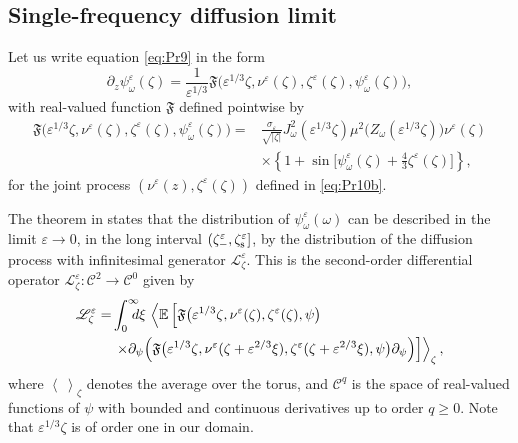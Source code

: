 \documentclass[final]{siamltex}
\begin{document}
\subsection{Single-frequency diffusion limit}
\label{ap:diflimit1}
Let us write equation \eqref{eq:Pr9} in the form 
\begin{equation}
\partial_z \psi_{\omega}^{\varepsilon}(\zeta) = \frac{1}{{\varepsilon}^{1/3}}
        {\mathfrak{F}}\big({\varepsilon}^{1/3} \zeta, \nu^{\varepsilon}(\zeta),
        \zeta^{\varepsilon}(\zeta),\psi_{\omega}^{\varepsilon}(\zeta)\big), \label{eq:CSF1}
\end{equation}
with real-valued function ${\mathfrak{F}}$ defined pointwise by
\begin{align}
\mathfrak{F}\big({\varepsilon}^{1/3} \zeta, \nu^{\varepsilon}(\zeta),
\zeta^{\varepsilon}(\zeta),\psi_{\omega}^{\varepsilon}(\zeta)\big)
=& \frac{\sigma_{\varepsilon}}{ \sqrt{|\zeta|}} J_{\omega}^2({\varepsilon}^{1/3} \zeta)
\mu^2 \big(Z_{\omega}({\varepsilon}^{1/3} \zeta)\big) \nu^{\varepsilon}(\zeta) \nonumber
\\ &\times \left\{ 1 + \sin \Big[ \psi_{\omega}^{\varepsilon}(\zeta) +
  \frac{4}{3}\zeta^{\varepsilon}(\zeta)\Big]\right\},
\end{align}
for the joint process $\left(\nu^{\varepsilon}(z), \zeta^{\varepsilon}(\zeta)\right)$
defined in \eqref{eq:Pr10b}.

The theorem in \cite[section III]{kim1996uniform} states that the
distribution of $\psi_{\omega}^{\varepsilon}({\omega})$ can be described in the limit ${\varepsilon}
\to 0$, in the long interval $(\zeta_{-}^{\varepsilon},\zeta_{\rm s}^{\varepsilon}]$, by the
  distribution of the diffusion process with infinitesimal generator
  $\mathscr{L}_\zeta^{\varepsilon}$.  This is the second-order differential operator
$\mathscr{L}_\zeta^{\varepsilon}:\mathscr{C}^2 \to \mathscr{C}^0$ given by
\begin{align}
\mathscr{L}_\zeta^{\varepsilon} = &
  \int_0^{\infty} \hspace{-0.1in} d \xi \, \left< {\mathbb{E}} \left[
    \mathfrak{F}\big({\varepsilon}^{1/3} \zeta,
    \nu^{\varepsilon}(\zeta),\zeta^{\varepsilon}(\zeta),\psi\big)
    \right. \right. \nonumber\\& \left. \left. \times \partial_\psi \Big(
    \mathfrak{F}\big({\varepsilon}^{1/3} \zeta, \nu^{\varepsilon}(\zeta + {\varepsilon}^{2/3}
    \xi),\zeta^{\varepsilon}(\zeta+{\varepsilon}^{2/3} \xi),\psi\big)\partial_\psi \Big)
    \right]\right>_{\zeta}, \label{eq:CSF2}
\end{align}
where $\left< ~ \right>_{\zeta}$ denotes the average over the torus,
and $\mathscr{C}^q$ is the space of real-valued functions of $\psi$
with bounded and continuous derivatives up to order $q \ge 0$. 
Note that ${\varepsilon}^{1/3} \zeta$ is of order one in our domain.
\end{document}
